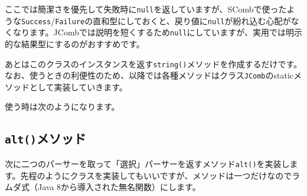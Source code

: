 ここでは簡潔さを優先して失敗時に\texttt{null}を返していますが、SCombで使ったような\texttt{Success}/\texttt{Failure}の直和型にしておくと、戻り値に\texttt{null}が紛れ込む心配がなくなります。JCombでは説明を短くするため\texttt{null}にしていますが、実用では明示的な結果型にするのがおすすめです。

あとはこのクラスのインスタンスを返す\texttt{string()}メソッドを作成するだけです。なお、使うときの利便性のため、以降では各種メソッドはクラス\texttt{JComb}のstaticメソッドとして実装していきます。

\begin{Shaded}
\begin{Highlighting}[]
 
   \NormalTok{\textgreater{} }\NormalTok{(}
      
\NormalTok{  \}}
\NormalTok{\}}
\end{Highlighting}
\end{Shaded}

使う時は次のようになります。

\begin{Shaded}
\begin{Highlighting}[]
\NormalTok{(}\NormalTok{);}
 \NormalTok{\textless{}}\NormalTok{\textgreater{}(}\NormalTok{, }\NormalTok{(}\NormalTok{));}
\NormalTok{(}\NormalTok{);}
\end{Highlighting}
\end{Shaded}

\hypertarget{chapter6-altux30e1ux30bdux30c3ux30c9}{%
\subsection{\texorpdfstring{\texttt{alt()}メソッド}{alt()メソッド}}\label{chapter6-altux30e1ux30bdux30c3ux30c9}}

次に二つのパーサーを取って「選択」パーサーを返すメソッド\texttt{alt()}を実装します。先程のようにクラスを実装してもいいですが、メソッドは一つだけなのでラムダ式（Java
8から導入された無名関数）にします。

